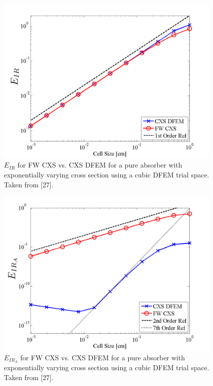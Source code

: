 %
%
\begin{figure}[!htp]
\centering
\includegraphics[width=11cm]{chapter3_variable_xs/FW_XS_P3_VarXS_E_I_L2.png}
\caption{$E_{IR}$ for FW CXS vs. CXS DFEM for a pure absorber with exponentially varying cross section using a cubic DFEM trial space.  Taken from [27].}
\label{fig:fw_accuracy_ir}
\end{figure}
%
%
\begin{figure}[!hbp]
\centering
\includegraphics[width=11cm]{chapter3_variable_xs/FW_XS_P3_VarXS_E_I_A.png}
\caption{$E_{IR_A}$ for FW CXS vs. CXS DFEM for a pure absorber with exponentially varying cross section using a cubic DFEM trial space.  Taken from [27].}
\label{fig:fw_accuracy_ir_a}
\end{figure}

